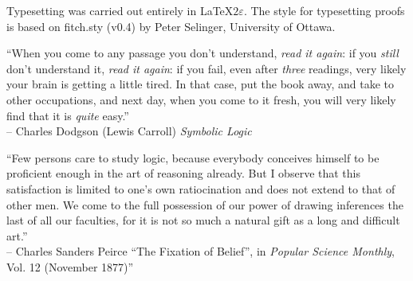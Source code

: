 \vfill

Typesetting was carried out entirely in \LaTeX$2\varepsilon$. The style for typesetting proofs is based on fitch.sty (v0.4) by Peter Selinger, University of Ottawa.





\pagebreak

``When you come to any passage you don't understand, \emph{read it again}: if you \emph{still} don't understand it, \emph{read it again}: if you fail, even after \emph{three} readings, very likely your brain is getting a little tired. In that case, put the book away, and take to other occupations, and next day, when you come to it fresh, you will very likely find that it is \emph{quite} easy.'' \\
-- Charles Dodgson (Lewis Carroll) \emph{Symbolic Logic} \citep{Dodgson1896}

\vspace{1cm}

``Few persons care to study logic, because everybody conceives himself to be proficient enough in the art of reasoning already. But I observe that this satisfaction is limited to one's own ratiocination and does not extend to that of other men. We come to the full possession of our power of drawing inferences the last of all our faculties, for it is not so much a natural gift as a long and difficult art.'' \\
-- Charles Sanders Peirce ``The Fixation of Belief'', in \textit{Popular Science Monthly}, Vol. 12 (November 1877)''
